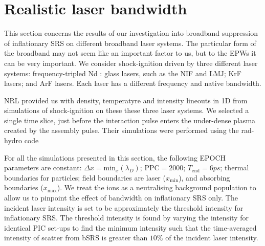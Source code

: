 \section{Realistic laser bandwidth}\label{sec:params}

This section concerns the results of our investigation into broadband suppression of inflationary SRS on different broadband laser systems. The particular form of the broadband may not seem like an important factor to us, but to the EPWs it can be very important.
We consider shock-ignition driven by three different laser systems: frequency-tripled Nd : glass lasers, such as the NIF and LMJ; KrF lasers; and ArF lasers. Each laser has a different frequency and native bandwidth. 

NRL provided us with density, temperatyre and intensity lineouts in 1D from simulations of shock-ignition on these these three laser systems. We selected a single time slice, just before the interaction pulse enters the under-dense plasma created by the assembly pulse. Their simulations were performed using the rad-hydro code 

For all the simulations presented in this section, the following EPOCH parameters are constant: $\Delta x = \mathrm{min}_x(\lambda_D)$; $\mathrm{PPC} = 2000$; $T_{\mathrm{end}}=6\si{ps}$; thermal boundaries for particles; field boundaries are laser ($x_{\mathrm{min}}$), and absorbing boundaries ($x_{\mathrm{max}}$). We treat the ions as a neutralising background population to allow us to pinpoint the effect of bandwidth on inflationary SRS only. The incident laser intensity is set to be approximately the threshold intensity for inflationary SRS. The threshold intensity is found by varying the intensity for identical PIC set-ups to find the minimum intensity such that the time-averaged intensity of scatter from bSRS is greater than $10\%$ of the incident laser intensity. 

